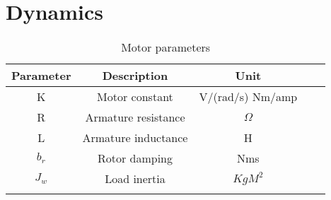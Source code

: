 


\section{Dynamics} \label{dc_math}

\begin{table}[h]
\centering
\begin{tabular}{cccll}
\hline
Parameter                   & Description                               & Unit				 &  &  \\ \hline
\multicolumn{1}{|c|}{K}     & \multicolumn{1}{c|}{Motor constant}       & \multicolumn{1}{c|}{ V/(rad/s)  Nm/amp} &  &  \\ \cline{1-3}
\multicolumn{1}{|c|}{R}     & \multicolumn{1}{c|}{Armature resistance}  & \multicolumn{1}{c|}{$\Omega$}            &  &  \\ \cline{1-3}
\multicolumn{1}{|c|}{L}     & \multicolumn{1}{c|}{Armature inductance}  & \multicolumn{1}{c|}{H}                    &  &  \\ \cline{1-3}
\multicolumn{1}{|c|}{$b_r$} & \multicolumn{1}{c|}{Rotor damping}        & \multicolumn{1}{c|}{Nms}                   &  &  \\ \cline{1-3}
\multicolumn{1}{|c|}{$J_w$} & \multicolumn{1}{c|}{Load inertia} & \multicolumn{1}{c|}{$KgM^2$}        &  &  \\ \cline{1-3}
\multicolumn{1}{l}{}        & \multicolumn{1}{l}{}                      & \multicolumn{1}{l}{}                          &  &  \\ \hline
\end{tabular}
\caption{Motor parameters}
\label{my-label}
\end{table}


